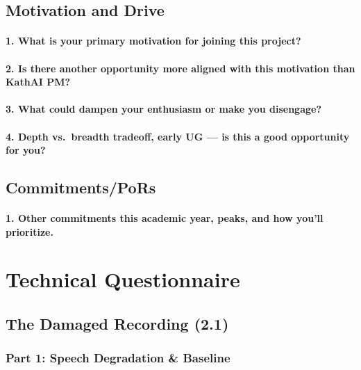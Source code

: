 \documentclass[11pt]{article}
\begin{document}
\subsection{Motivation and Drive}

\paragraph{1. What is your primary motivation for joining this project?}
%

\paragraph{2. Is there another opportunity more aligned with this motivation than KathAI PM?}
%

\paragraph{3. What could dampen your enthusiasm or make you disengage?}
%

\paragraph{4. Depth vs.\ breadth tradeoff, early UG — is this a good opportunity for you?}
%

\subsection{Commitments/PoRs}

\paragraph{1. Other commitments this academic year, peaks, and how you'll prioritize.}
%

\section{Technical Questionnaire}

\subsection{The Damaged Recording (2.1)}

\subsubsection*{Part 1: Speech Degradation \& Baseline}
\end{document}
